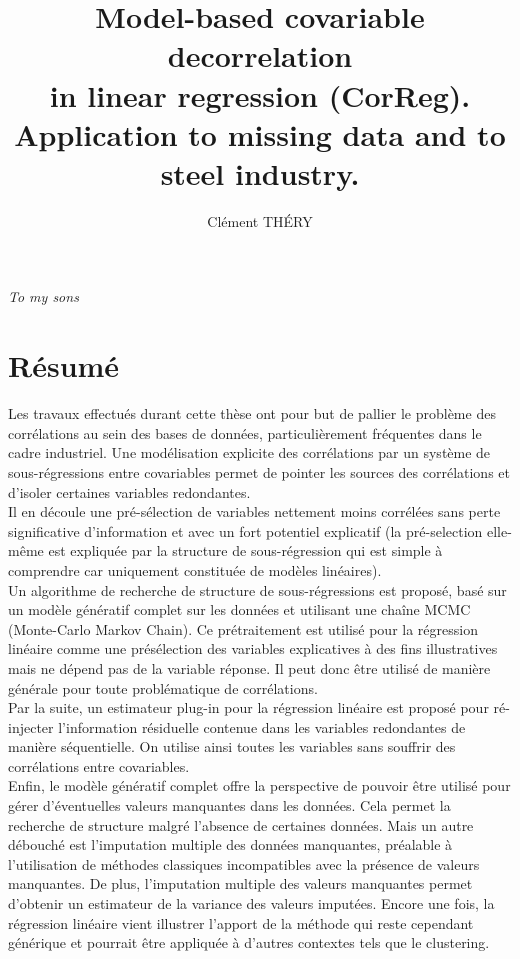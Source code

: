 \documentclass[12pt,a4paper]{report}
\author{Clément TH\'ERY}
\title{Model-based covariable decorrelation \\ in linear regression ({\sc CorReg}).\\ Application to missing data and to steel industry.}
\begin{document}
%	
\maketitle

\newpage
\itshape To my sons
\upshape


\chapter*{Résumé}
	Les travaux effectués durant cette thèse ont pour but de pallier le problème des corrélations au sein des bases de données, particulièrement fréquentes dans le cadre industriel. Une modélisation explicite des corrélations par un système de sous-régressions entre covariables permet de pointer les sources des corrélations et d'isoler certaines variables redondantes. 
	\\
	
	Il en découle une pré-sélection de variables nettement moins corrélées sans perte significative d'information et avec un fort potentiel explicatif (la pré-selection elle-même est expliquée par la structure de sous-régression qui est simple à comprendre car uniquement constituée de modèles linéaires). \\
	
	Un algorithme de recherche de structure de sous-régressions est proposé, basé sur un modèle génératif complet sur les données et utilisant une chaîne MCMC (Monte-Carlo Markov Chain). Ce prétraitement est utilisé pour la régression linéaire comme une présélection des variables explicatives à des fins illustratives mais ne dépend pas de la variable réponse. Il peut donc être utilisé de manière générale pour toute problématique de corrélations.\\
	
	Par la suite, un estimateur plug-in pour la régression linéaire est proposé pour ré-injecter l'information résiduelle contenue dans les variables redondantes de manière séquentielle. On utilise ainsi toutes les variables sans souffrir des corrélations entre covariables.
	\\
	
	Enfin, le modèle génératif complet offre la perspective de pouvoir être utilisé pour gérer d'éventuelles valeurs manquantes dans les données. Cela permet la recherche de structure malgré l'absence de certaines données. Mais un autre débouché est l'imputation multiple des données manquantes, préalable à l'utilisation de méthodes classiques incompatibles avec la présence de valeurs manquantes. De plus, l'imputation multiple des valeurs manquantes permet d'obtenir un estimateur de la variance des valeurs imputées.
	Encore une fois, la régression linéaire vient illustrer l'apport de la méthode qui reste cependant générique et pourrait être appliquée à d'autres contextes tels que le clustering.
	\\	
	
\end{document}
